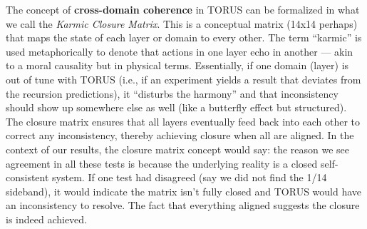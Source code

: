 \documentclass[12pt]{article}
\begin{document}
The concept of \textbf{cross-domain coherence} in TORUS can be formalized in what we call the \emph{Karmic Closure Matrix}. This is a conceptual matrix (14x14 perhaps) that maps the state of each layer or domain to every other. The term “karmic” is used metaphorically to denote that actions in one layer echo in another — akin to a moral causality but in physical terms. Essentially, if one domain (layer) is out of tune with TORUS (i.e., if an experiment yields a result that deviates from the recursion predictions), it “disturbs the harmony” and that inconsistency should show up somewhere else as well (like a butterfly effect but structured). The closure matrix ensures that all layers eventually feed back into each other to correct any inconsistency, thereby achieving closure when all are aligned. In the context of our results, the closure matrix concept would say: the reason we see agreement in all these tests is because the underlying reality is a closed self-consistent system. If one test had disagreed (say we did not find the 1/14 sideband), it would indicate the matrix isn’t fully closed and TORUS would have an inconsistency to resolve. The fact that everything aligned suggests the closure is indeed achieved.
\end{document}
